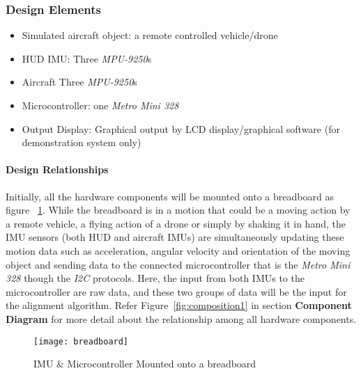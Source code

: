 		\subsubsection{Design Elements}
			\begin{itemize}
				\item Simulated aircraft object: a remote controlled vehicle/drone
				\item HUD IMU: Three \textit{MPU-9250}s
				\item Aircraft Three \textit{MPU-9250}s
				\item Microcontroller: one \textit{Metro Mini 328}
				\item Output Display: Graphical output by LCD display/graphical software (for demonstration system only)\\
			\end{itemize}

			\paragraph{Design Relationships}
			Initially, all the hardware components will be mounted onto a breadboard as figure ~\ref{fig:breadboard}. While the breadboard is in a motion that could be a moving action by a remote vehicle, a flying action of a drone or simply by shaking it in hand, the IMU sensors (both HUD and aircraft IMUs) are simultaneously updating these motion data such as acceleration, angular velocity and orientation of the moving object and sending data to the connected microcontroller that is the \textit{Metro Mini 328} though the \textit{I2C} protocols. Here, the input from both IMUs to the microcontroller are raw data, and these two groups of data will be the input for the alignment algorithm. Refer Figure~\ref{fig:composition1} in section \textbf{Component Diagram} for more detail about the relationship among all hardware components.\\

			\begin{figure}
				\centering
			 		\caption{IMU \& Microcontroller Mounted onto a breadboard}
			      	\texttt{[image: breadboard]}
			    \label{fig:breadboard}
			\end{figure}



